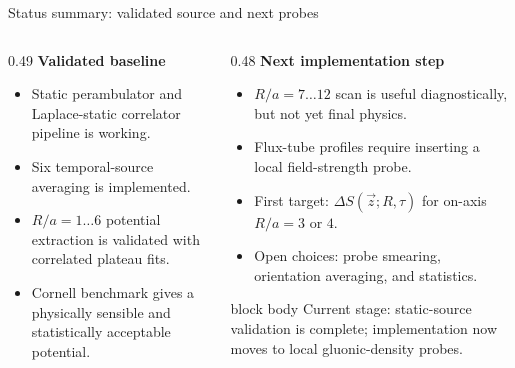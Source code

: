 \documentclass[11pt,rgb,ratio=169]{beamer}
\newcommand{\tightitems}{\setlength\itemsep{0.28em}\setlength\parskip{0pt}}
\begin{document}
\begin{frame}{Status summary: validated source and next probes}
\begin{columns}[T,totalwidth=\textwidth]

\begin{column}{0.49\textwidth}
\textbf{Validated baseline}\vspace{0.2em}
\begin{itemize}\tightitems
  \item Static perambulator and Laplace-static correlator pipeline is working.
  \item Six temporal-source averaging is implemented.
  \item $R/a=1\ldots6$ potential extraction is validated with correlated plateau fits.
  \item Cornell benchmark gives a physically sensible and statistically acceptable potential.
\end{itemize}
\end{column}

\begin{column}{0.48\textwidth}
\textbf{Next implementation step}\vspace{0.2em}
\begin{itemize}\tightitems
  \item $R/a=7\ldots12$ scan is useful diagnostically, but not yet final physics.
  \item Flux-tube profiles require inserting a local field-strength probe.
  \item First target: $\Delta S(\vec z;R,\tau)$ for on-axis $R/a=3$ or $4$.
  \item Open choices: probe smearing, orientation averaging, and statistics.
\end{itemize}

\vspace{0.21em}
\begin{beamercolorbox}[rounded=true,sep=0.45em,wd=0.92\linewidth]{block body}
\centering
\scriptsize
Current stage: static-source validation is complete; implementation now moves to local gluonic-density probes.
\end{beamercolorbox}
\end{column}

\end{columns}
\end{frame}
\end{document}
